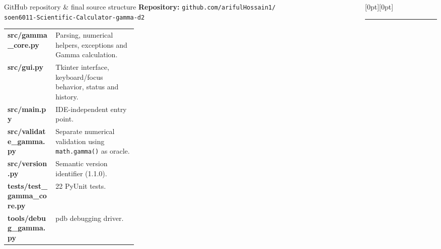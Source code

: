 \documentclass[final]{beamer}
\newcommand{\vdivider}[1]{%
  \begin{column}{0.007\textwidth}
  \centering\color{LineGray!85}%
  \raisebox{-#1}[0pt][0pt]{\rule{0.05cm}{#1}}%
  \end{column}%
}
\begin{document}
\begin{frame}[t]
\begin{columns}[T,totalwidth=0.970\textwidth]
\begin{column}{0.306\textwidth}
\vspace{0.18cm}
\begin{block}{GitHub repository \& final source structure}
\scriptsize
\textbf{Repository:} \texttt{github.com/arifulHossain1/}\\[-0.02cm]
\hspace*{2.1cm}\texttt{soen6011-Scientific-Calculator-gamma-d2}
\vspace{0.07cm}
\begin{tabularx}{\linewidth}{>{\ttfamily\bfseries}p{0.37\linewidth} X}
src/gamma\_core.py & Parsing, numerical helpers, exceptions and Gamma calculation.\\
src/gui.py & Tkinter interface, keyboard/focus behavior, status and history.\\
src/main.py & IDE-independent entry point.\\
src/validate\_gamma.py & Separate numerical validation using \texttt{math.gamma()} as oracle.\\
src/version.py & Semantic version identifier (1.1.0).\\
tests/test\_gamma\_core.py & 22 PyUnit tests.\\
tools/debug\_gamma.py & pdb debugging driver.\\
\end{tabularx}
\end{block}
\end{column}

\vdivider{25.6cm}


\end{columns}
\end{frame}
\end{document}

